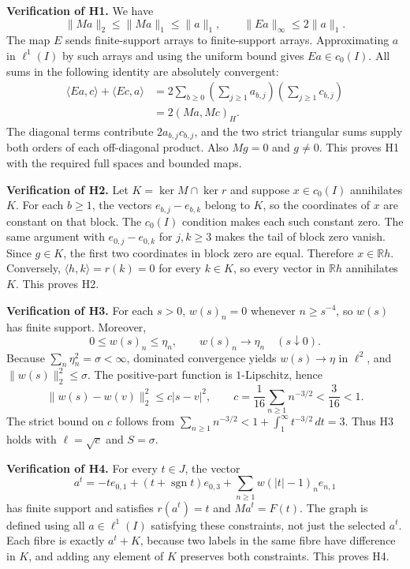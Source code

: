 \documentclass[11pt,a4paper]{article}
\begin{document}
\textbf{Verification of H1.} We have
\[
\|Ma\|_2\le\|Ma\|_1\le\|a\|_1,\qquad
\|Ea\|_\infty\le2\|a\|_1.
\]
The map $E$ sends finite-support arrays to finite-support arrays. Approximating $a$ in $\ell^1(I)$ by such arrays and using the uniform bound gives $Ea\in c_0(I)$. All sums in the following identity are absolutely convergent:
\[
\begin{aligned}
\langle Ea,c\rangle+\langle Ec,a\rangle
&=2\sum_{b\ge0}\left(\sum_{j\ge1}a_{b,j}\right)
                    \left(\sum_{j\ge1}c_{b,j}\right)\\
&=2(Ma,Mc)_H.
\end{aligned}
\]
The diagonal terms contribute $2a_{b,j}c_{b,j}$, and the two strict triangular sums supply both orders of each off-diagonal product. Also $Mg=0$ and $g\ne0$. This proves H1 with the required full spaces and bounded maps.

\textbf{Verification of H2.} Let $K=\ker M\cap\ker r$ and suppose $x\in c_0(I)$ annihilates $K$. For each $b\ge1$, the vectors $e_{b,j}-e_{b,k}$ belong to $K$, so the coordinates of $x$ are constant on that block. The $c_0(I)$ condition makes each such constant zero. The same argument with $e_{0,j}-e_{0,k}$ for $j,k\ge3$ makes the tail of block zero vanish. Since $g\in K$, the first two coordinates in block zero are equal. Therefore $x\in\mathbb Rh$. Conversely, $\langle h,k\rangle=r(k)=0$ for every $k\in K$, so every vector in $\mathbb Rh$ annihilates $K$. This proves H2.

\textbf{Verification of H3.} For each $s>0$, $w(s)_n=0$ whenever $n\ge s^{-4}$, so $w(s)$ has finite support. Moreover,
\[
0\le w(s)_n\le\eta_n,\qquad
w(s)_n\longrightarrow\eta_n\quad(s\downarrow0).
\]
Because $\sum_n\eta_n^2=\sigma<\infty$, dominated convergence yields $w(s)\to\eta$ in $\ell^2$, and $\|w(s)\|_2^2\le\sigma$. The positive-part function is $1$-Lipschitz, hence
\[
\|w(s)-w(v)\|_2^2\le c|s-v|^2,\qquad
c=\frac1{16}\sum_{n\ge1}n^{-3/2}<\frac3{16}<1.
\]
The strict bound on $c$ follows from $\sum_{n\ge1}n^{-3/2}<1+\int_1^\infty t^{-3/2}\,dt=3$. Thus H3 holds with $\ell=\sqrt c$ and $S=\sigma$.

\textbf{Verification of H4.} For every $t\in J$, the vector
\[
a^t=-t e_{0,1}+(t+\operatorname{sgn}t)e_{0,3}
    +\sum_{n\ge1}w(|t|-1)_n e_{n,1}
\tag{C4}
\]
has finite support and satisfies $r(a^t)=t$ and $Ma^t=F(t)$. The graph is defined using all $a\in\ell^1(I)$ satisfying these constraints, not just the selected $a^t$. Each fibre is exactly $a^t+K$, because two labels in the same fibre have difference in $K$, and adding any element of $K$ preserves both constraints. This proves H4.
\end{document}
